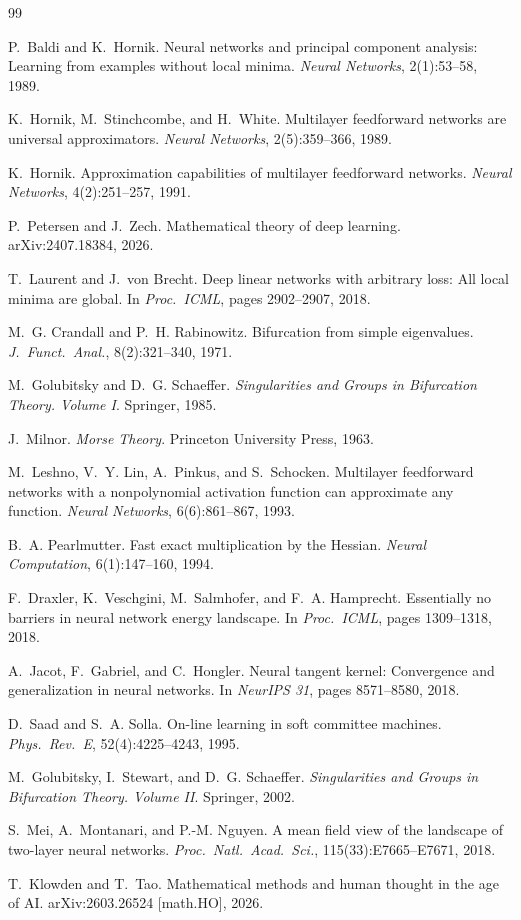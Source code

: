 \documentclass[11pt, reqno]{amsart}
\theoremstyle{plain}
\theoremstyle{definition}
\theoremstyle{remark}
\begin{document}
\clearpage
\begin{thebibliography}{99}

P.~Baldi and K.~Hornik.
Neural networks and principal component analysis: Learning from examples without local minima.
{\em Neural Networks}, 2(1):53--58, 1989.

K.~Hornik, M.~Stinchcombe, and H.~White.
Multilayer feedforward networks are universal approximators.
{\em Neural Networks}, 2(5):359--366, 1989.

K.~Hornik.
Approximation capabilities of multilayer feedforward networks.
{\em Neural Networks}, 4(2):251--257, 1991.

P.~Petersen and J.~Zech.
Mathematical theory of deep learning.
arXiv:2407.18384, 2026.

T.~Laurent and J.~von Brecht.
Deep linear networks with arbitrary loss: All local minima are global.
In {\em Proc.\ ICML}, pages 2902--2907, 2018.

M.~G. Crandall and P.~H. Rabinowitz.
Bifurcation from simple eigenvalues.
{\em J.\ Funct.\ Anal.}, 8(2):321--340, 1971.

M.~Golubitsky and D.~G. Schaeffer.
{\em Singularities and Groups in Bifurcation Theory. Volume I}.
Springer, 1985.

J.~Milnor.
{\em Morse Theory}.
Princeton University Press, 1963.

M.~Leshno, V.~Y. Lin, A.~Pinkus, and S.~Schocken.
Multilayer feedforward networks with a nonpolynomial activation function can approximate any function.
{\em Neural Networks}, 6(6):861--867, 1993.

B.~A. Pearlmutter.
Fast exact multiplication by the Hessian.
{\em Neural Computation}, 6(1):147--160, 1994.

F.~Draxler, K.~Veschgini, M.~Salmhofer, and F.~A. Hamprecht.
Essentially no barriers in neural network energy landscape.
In {\em Proc.\ ICML}, pages 1309--1318, 2018.

A.~Jacot, F.~Gabriel, and C.~Hongler.
Neural tangent kernel: Convergence and generalization in neural networks.
In {\em NeurIPS 31}, pages 8571--8580, 2018.

D.~Saad and S.~A. Solla.
On-line learning in soft committee machines.
{\em Phys.\ Rev.\ E}, 52(4):4225--4243, 1995.

M.~Golubitsky, I.~Stewart, and D.~G. Schaeffer.
{\em Singularities and Groups in Bifurcation Theory. Volume II}.
Springer, 2002.

S.~Mei, A.~Montanari, and P.-M. Nguyen.
A mean field view of the landscape of two-layer neural networks.
{\em Proc.\ Natl.\ Acad.\ Sci.}, 115(33):E7665--E7671, 2018.

T.~Klowden and T.~Tao.
Mathematical methods and human thought in the age of {AI}.
arXiv:2603.26524 [math.HO], 2026.

\end{thebibliography}
\end{document}

